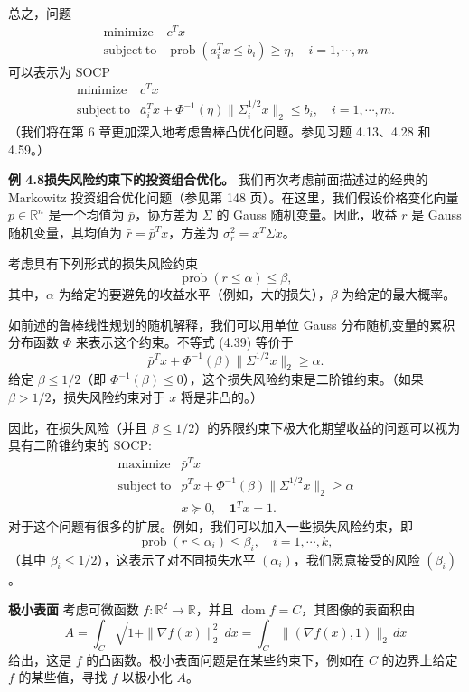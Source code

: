 \documentclass[UTF8,12pt,a4paper,fontset=fandol]{ctexart}
\begin{document}
总之，问题
\[
\begin{array}{ll}
\mathop{\mathrm{minimize}} & c^Tx\\
\mathrm{subject\ to} & \operatorname{prob}(a_i^Tx\leq b_i)\geq \eta,\quad i=1,\cdots,m
\end{array}
\]
可以表示为 SOCP
\[
\begin{array}{ll}
\mathop{\mathrm{minimize}} & c^Tx\\
\mathrm{subject\ to} & \bar a_i^Tx+\Phi^{-1}(\eta)\|\Sigma_i^{1/2}x\|_2\leq b_i,\quad i=1,\cdots,m.
\end{array}
\]
（我们将在第 6 章更加深入地考虑鲁棒凸优化问题。参见习题 4.13、4.28 和 4.59。）

\noindent\textbf{例 4.8\quad 损失风险约束下的投资组合优化。}\quad
我们再次考虑前面描述过的经典的 Markowitz 投资组合优化问题（参见第 148 页）。在这里，我们假设价格变化向量 $p\in\mathbb{R}^n$ 是一个均值为 $\bar p$，协方差为 $\Sigma$ 的 Gauss 随机变量。因此，收益 $r$ 是 Gauss 随机变量，其均值为 $\bar r=\bar p^Tx$，方差为 $\sigma_r^2=x^T\Sigma x$。

考虑具有下列形式的损失风险约束
\begin{equation}
\operatorname{prob}(r\leq \alpha)\leq \beta,
\tag{4.39}
\end{equation}
其中，$\alpha$ 为给定的要避免的收益水平（例如，大的损失），$\beta$ 为给定的最大概率。

如前述的鲁棒线性规划的随机解释，我们可以用单位 Gauss 分布随机变量的累积分布函数 $\Phi$ 来表示这个约束。不等式 (4.39) 等价于
\[
\bar p^Tx+\Phi^{-1}(\beta)\|\Sigma^{1/2}x\|_2\geq \alpha.
\]
给定 $\beta\leq 1/2$（即 $\Phi^{-1}(\beta)\leq 0$），这个损失风险约束是二阶锥约束。（如果 $\beta>1/2$，损失风险约束对于 $x$ 将是非凸的。）

因此，在损失风险（并且 $\beta\leq 1/2$）的界限约束下极大化期望收益的问题可以视为具有二阶锥约束的 SOCP:
\[
\begin{array}{ll}
\mathop{\mathrm{maximize}} & \bar p^Tx\\
\mathrm{subject\ to} & \bar p^Tx+\Phi^{-1}(\beta)\|\Sigma^{1/2}x\|_2\geq \alpha\\
& x\succeq 0,\quad \mathbf{1}^Tx=1.
\end{array}
\]
对于这个问题有很多的扩展。例如，我们可以加入一些损失风险约束，即
\[
\operatorname{prob}(r\leq \alpha_i)\leq \beta_i,\quad i=1,\cdots,k,
\]
（其中 $\beta_i\leq 1/2$），这表示了对不同损失水平 $(\alpha_i)$，我们愿意接受的风险 $(\beta_i)$。

\noindent\textbf{极小表面}\quad
考虑可微函数 $f:\mathbb{R}^2\to\mathbb{R}$，并且 $\operatorname{dom}f=C$，其图像的表面积由
\[
A=\int_C\sqrt{1+\|\nabla f(x)\|_2^2}\,dx=\int_C\|(\nabla f(x),1)\|_2\,dx
\]
给出，这是 $f$ 的凸函数。极小表面问题是在某些约束下，例如在 $C$ 的边界上给定 $f$ 的某些值，寻找 $f$ 以极小化 $A$。
\end{document}
